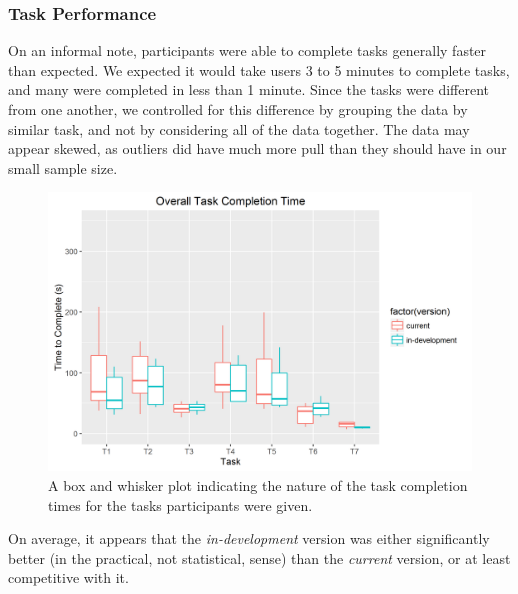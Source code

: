 \documentclass{article}
\begin{document}
% 
\subsubsection{Task Performance}
On an informal note, participants were able to complete tasks generally faster than expected. We expected it would take users 3 to 5 minutes to complete tasks, and many were completed in less than 1 minute. Since the tasks were different from one another, we controlled for this difference by grouping the data by similar task, and not by considering all of the data together. The data may appear skewed, as outliers did have much more pull than they should have in our small sample size.

\begin{figure}[h!]
  \centering
  \includegraphics[width=.6\linewidth]{overall_task_completion}
  \caption{A box and whisker plot indicating the nature of the task completion times for the tasks participants were given.}
  \label{fig:overall_task_completion}
\end{figure}

On average, it appears that the \emph{in-development} version was either significantly better (in the practical, not statistical, sense) than the \emph{current} version, or at least competitive with it.
\end{document}

